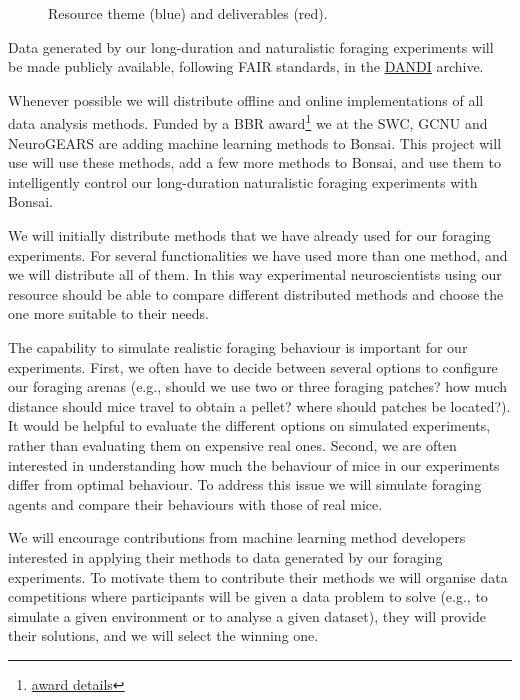 \begin{figure}
    \begin{center}
        
    \end{center}
    \caption{Resource theme (blue) and deliverables (red).}
    \label{fig:resource}
\end{figure}

Data generated by our long-duration and naturalistic foraging experiments will
be made publicly available, following FAIR standards, in the
\href{https://dandiarchive.org/}{DANDI} archive.

Whenever possible we will distribute offline and online implementations of all
data analysis methods.
%
Funded by a BBR
award\footnote{\href{https://gow.bbsrc.ukri.org/grants/AwardDetails.aspx?FundingReference=BB\%2FW019132\%2F1}{award details}}
we at the SWC, GCNU and NeuroGEARS are adding machine learning methods to
Bonsai. This project will use will use these methods, add a few more methods to
Bonsai, and use them to intelligently control our long-duration naturalistic
foraging experiments with Bonsai.

We will initially distribute methods that we have already used for our foraging
experiments. For several functionalities we have used more than one method, and
we will distribute all of them. In this way experimental neuroscientists using
our resource should be able to compare different distributed methods and choose
the one more suitable to their needs.

The capability to simulate realistic foraging behaviour is important for our
experiments. First, we often have to decide between several options to
configure our foraging arenas (e.g., should we use two or three foraging
patches? how much distance should mice travel to obtain a pellet? where should
patches be located?). It would be helpful to evaluate the different options on
simulated experiments, rather than evaluating them on expensive real
ones. Second, we are often interested in understanding how much the
behaviour of mice in our experiments differ from optimal behaviour. To address
this issue we will simulate foraging agents and
compare their behaviours with those of real mice.

We will encourage contributions from machine learning method developers
interested in applying their methods to data generated by our foraging
experiments. To motivate them to contribute their methods we will organise data
competitions where participants will be given a data problem to solve (e.g., to
simulate a given environment or to analyse a given dataset), they will provide
their solutions, and we will select the winning one.

